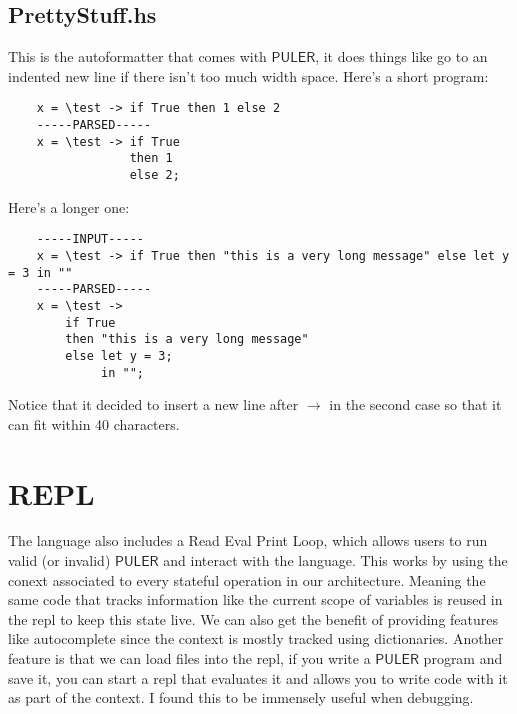 \documentclass{article} %
\newcommand{\PULER}{\mathsf{PULER}}
\begin{document}
    \subsection{PrettyStuff.hs}
    This is the autoformatter that comes with $\PULER$, it does things like go to an indented new line if there isn't too much width space. Here's a short program:
    \begin{verbatim}
    x = \test -> if True then 1 else 2
    -----PARSED-----
    x = \test -> if True
                 then 1
                 else 2;
    \end{verbatim}
    Here's a longer one:
    \begin{verbatim}
    -----INPUT-----
    x = \test -> if True then "this is a very long message" else let y = 3 in ""
    -----PARSED-----
    x = \test ->
        if True
        then "this is a very long message"
        else let y = 3;
             in "";
    \end{verbatim}
    Notice that it decided to insert a new line after $\to$ in the second case so that it can fit within 40 characters.
\section {REPL}
    The language also includes a Read Eval Print Loop, which allows users to run valid (or invalid) $\PULER$ and interact with the language. This works by using the conext associated to every stateful operation in our architecture. Meaning the same code that tracks information like the current scope of variables is reused in the repl to keep this state live. We can also get the benefit of providing features like autocomplete since the context is mostly tracked using dictionaries. Another feature is that we can load files into the repl, if you write a $\PULER$ program and save it, you can start a repl that evaluates it and allows you to write code with it as part of the context. I found this to be immensely useful when debugging.
\end{document}
